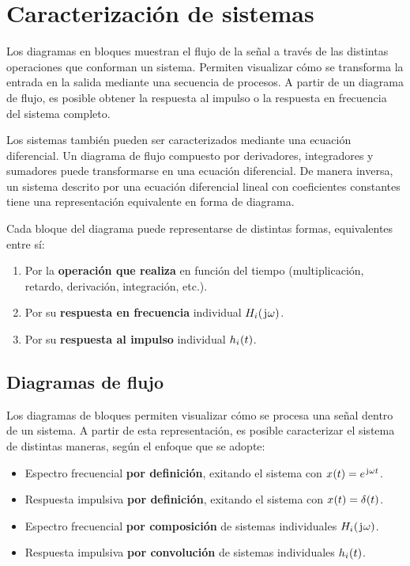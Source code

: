 \chapter{Caracterización de sistemas}

Los diagramas en bloques muestran el flujo de la señal a través de las distintas operaciones que conforman un sistema.
Permiten visualizar cómo se transforma la entrada en la salida mediante una secuencia de procesos.
A partir de un diagrama de flujo, es posible obtener la respuesta al impulso o la respuesta en frecuencia del sistema completo.

Los sistemas también pueden ser caracterizados mediante una ecuación diferencial.
Un diagrama de flujo compuesto por derivadores, integradores y sumadores puede transformarse en una ecuación diferencial.
De manera inversa, un sistema descrito por una ecuación diferencial lineal con coeficientes constantes tiene una representación equivalente en forma de diagrama.

Cada bloque del diagrama puede representarse de distintas formas, equivalentes entre sí:

\begin{enumerate}
    \item Por la \textbf{operación que realiza} en función del tiempo (multiplicación, retardo, derivación, integración, etc.).
    \item Por su \textbf{respuesta en frecuencia} individual $\fx[H_\ith]{\iu \omega}$.
    \item Por su \textbf{respuesta al impulso} individual $\fx[h_\ith]{t}$.
\end{enumerate}

\section{Diagramas de flujo}

Los diagramas de bloques permiten visualizar cómo se procesa una señal dentro de un sistema.
A partir de esta representación, es posible caracterizar el sistema de distintas maneras, según el enfoque que se adopte:

\begin{itemize}
    \item Espectro frecuencial \textbf{por definición}, exitando el sistema con $\fx[x]{t} = \complexExp$.
    \item Respuesta impulsiva \textbf{por definición}, exitando el sistema con $\fx[x]{t} = \fx[\delta]{t}$.
    \item Espectro frecuencial \textbf{por composición} de sistemas individuales $\fx[H_\ith]{\iu \omega}$.
    \item Respuesta impulsiva \textbf{por convolución} de sistemas individuales $\fx[h_\ith]{t}$.
\end{itemize}

